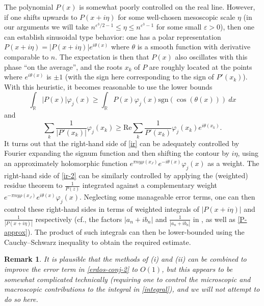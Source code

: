 \documentclass[12pt]{amsart}
\newtheorem{remark}[theorem]{Remark}
\newcommand{\eps}{\varepsilon}
\newcommand{\R}{\mathbb{R}}
\begin{document}
The polynomial $P(x)$ is somewhat poorly controlled on the real line.  However, if one shifts upwards to $P(x+i\eta)$ for some well-chosen mesoscopic scale $\eta$ (in our arguments we will take $n^{\eps^3/2-1} \leq \eta \leq n^{\eps^3-1}$ for some small $\eps>0$), then one can establish sinusoidal type behavior: one has a polar representation $P(x+i\eta) = |P(x+i\eta)| e^{i \theta(x)}$ where $\theta$ is a smooth function with derivative comparable to $n$.  The expectation is then that $P(x)$ also oscillates with this phase ``on the average'', and the roots $x_k$ of $P$ are roughly located at the points where $e^{i\theta(x)}$ is $\pm 1$ (with the sign here corresponding to the sign of $P'(x_k)$).  With this heuristic, it becomes reasonable to use the lower bounds
\begin{equation}\label{ir}
\int_\R |P(x)| \varphi_j(x) \geq \int_\R P(x) \varphi_j(x) \mathrm{sgn}(\cos(\theta(x)))\ dx
\end{equation}
and
\begin{equation}\label{ir-2}
    \sum_k \frac{1}{|P'(x_k)|} \varphi_j(x_k) \geq \mathrm{Re} \sum_k \frac{1}{P'(x_k)} \varphi_j(x_k) e^{i\theta(x_k)}.
\end{equation}
It turns out that the right-hand side of \eqref{ir} can be adequately controlled by Fourier expanding the signum function and then shifting the contour by $i\eta$, using an approximately holomorphic function $e^{\pi n y \rho(x_J)} e^{-i\theta(x)} \varphi_j(x)$ as a weight.  The right-hand side of \eqref{ir-2} can be similarly controlled by applying the (weighted) residue theorem to $\frac{1}{P(z)}$ integrated against a complementary weight $e^{-\pi n y \rho(x_J)} e^{i\theta(x)} \varphi_j(x)$.  Neglecting some manageable error terms, one can then control these right-hand sides in terms of weighted integrals of $|P(x+i\eta)|$ and $\frac{1}{|P(x+i\eta)|}$ respectively (cf., the factors $|a_n+ib_n|$ and $\frac{1}{|a_n+ib_n|}$ in , as well as \eqref{P-approx}).  The product of such integrals can then be lower-bounded using the Cauchy--Schwarz inequality to obtain the required estimate.

\begin{remark}
It is plausible that the methods of (i) and (ii) can be combined to improve the error term in \eqref{erdos-conj-2} to $O(1)$, but this appears to be somewhat complicated technically (requiring one to control the microscopic and macroscopic contributions to the integral in \eqref{integral}), and we will not attempt to do so here.
\end{remark}
\end{document}
